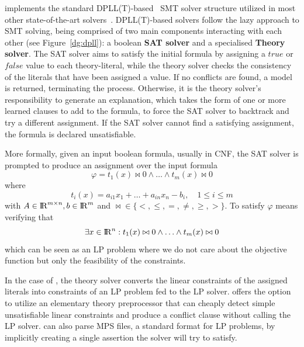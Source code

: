 \documentclass[runningheads]{llncs}
\begin{document}
\dlinear implements the standard DPLL(T)-based~\cite{ref:dpll-t} SMT solver structure utilized in most other state-of-the-art solvers~\cite{ref:z3-dpll-t}.
DPLL(T)-based solvers follow the lazy approach to SMT solving, being comprised of two main components interacting with each other (see Figure~\ref{dg:dpll}): a boolean \textbf{SAT solver} and a specialised \textbf{Theory solver}.
The SAT solver aims to satisfy the initial formula by assigning a $true$ or $false$ value to each theory-literal, while the theory solver checks the consistency of the literals that have been assigned a value.
If no conflicts are found, a model is returned, terminating the process.
Otherwise, it is the theory solver's responsibility to generate an explanation, which takes the form of one or more learned clauses to add to the formula, to force the SAT solver to backtrack and try a different assignment.
If the SAT solver cannot find a satisfying assignment, the formula is declared unsatisfiable.

More formally, given an input boolean formula, usually in CNF, the SAT solver is prompted to produce an assignment over the input formula
\begin{equation} %
    \label{eq:smt-formula}
    \varphi = t_1(x) \bowtie 0 \wedge \ldots \wedge t_m (x) \bowtie 0
\end{equation}
where
\begin{equation*}
    t_i(x) = a_{i1}x_1 + \ldots + a_{in}x_n - b_i, \quad 1 \le i \le m
\end{equation*}
with $A \in {\rm I\!R}^{m \times n}, b \in {\rm I\!R}^m$ and $\bowtie \in \{<, \le, =, \ne, \ge, >\}$.
To satisfy $\varphi$ means verifying that
\begin{equation*}
    \exists x \in {\rm I\!R}^n : t_1(x) \bowtie 0 \wedge \ldots \wedge t_m(x) \bowtie 0
\end{equation*}
which can be seen as an LP problem where we do not care about the objective function but only the feasibility of the constraints.

In the case of \dlinear, the theory solver converts the linear constraints of the assigned literals into constraints of an LP problem fed to the LP solver.
\dlinear offers the option to utilize an elementary theory preprocessor that can cheaply detect simple unsatisfiable linear constraints and produce a conflict clause without calling the LP solver.
\dlinear can also parse MPS files, a standard format for LP problems, by implicitly creating a single assertion the solver will try to satisfy.
\end{document}
